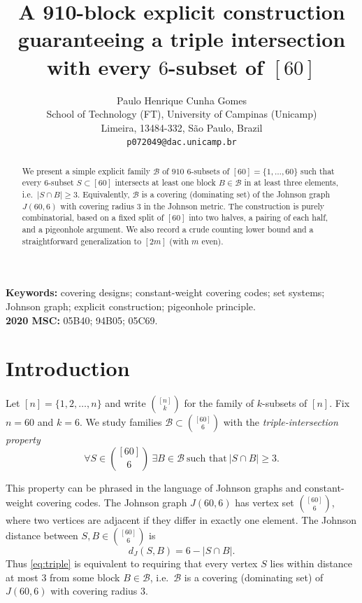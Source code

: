 \documentclass[11pt]{article}
\title{A 910-block explicit construction guaranteeing a triple intersection\\
with every $6$-subset of $[60]$}
\author{Paulo Henrique Cunha Gomes\\
School of Technology (FT), University of Campinas (Unicamp)\\
Limeira, 13484-332, S\~ao Paulo, Brazil\\
\texttt{p072049@dac.unicamp.br}}
\date{}
\begin{document}
\maketitle

\begin{abstract}
We present a simple explicit family $\mathcal{B}$ of $910$ $6$-subsets of $[60]=\{1,\dots,60\}$
such that every $6$-subset $S\subset[60]$ intersects at least one block $B\in\mathcal{B}$ in at least
three elements, i.e.\ $|S\cap B|\ge 3$.
Equivalently, $\mathcal{B}$ is a covering (dominating set) of the Johnson graph $J(60,6)$ with covering
radius $3$ in the Johnson metric.
The construction is purely combinatorial, based on a fixed split of $[60]$ into two halves, a pairing
of each half, and a pigeonhole argument.
We also record a crude counting lower bound and a straightforward generalization to $[2m]$ (with $m$ even).
\end{abstract}

\medskip
\noindent\textbf{Keywords:} covering designs; constant-weight covering codes; set systems; Johnson graph; explicit construction; pigeonhole principle.\\
\textbf{2020 MSC:} 05B40; 94B05; 05C69.


\section{Introduction}

Let $[n]=\{1,2,\dots,n\}$ and write $\binom{[n]}{k}$ for the family of $k$-subsets of $[n]$.
Fix $n=60$ and $k=6$.
We study families $\mathcal{B}\subset \binom{[60]}{6}$ with the \emph{triple-intersection property}
\begin{equation}\label{eq:triple}
\forall S\in \binom{[60]}{6}\ \exists B\in\mathcal{B}\ \text{such that}\ |S\cap B|\ge 3.
\end{equation}

This property can be phrased in the language of Johnson graphs and constant-weight covering codes.
The Johnson graph $J(60,6)$ has vertex set $\binom{[60]}{6}$, where two vertices are adjacent
if they differ in exactly one element.
The Johnson distance between $S,B\in\binom{[60]}{6}$ is
\begin{equation}\label{eq:johnson-distance}
d_J(S,B)=6-|S\cap B|.
\end{equation}
Thus \eqref{eq:triple} is equivalent to requiring that every vertex $S$ lies within
distance at most $3$ from some block $B\in\mathcal{B}$, i.e.\ $\mathcal{B}$ is a covering (dominating set)
of $J(60,6)$ with covering radius $3$.
\end{document}

